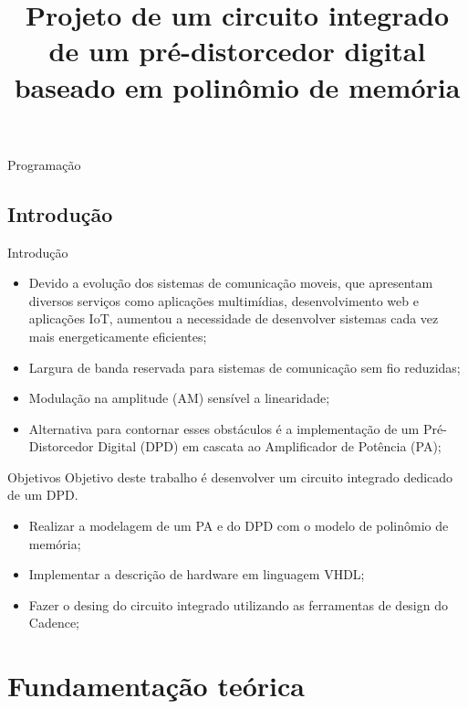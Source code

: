 \documentclass{if-beamer}
\title[Pré-distorcedor digital baseado em polinômio de memória]{\textbf{Projeto de um circuito integrado de um pré-distorcedor digital baseado em polinômio de memória}}
\subtitle{}
\author[Leonardo de Andrade Santos]{\large \negrito{Leonardo de Andrade Santos}}
\institute[UFPR/PR]{
    \small \textit{Universidade Federal do Paraná} \\
}
\date{\the\year}
\begin{document}
\begin{frame}
  \titlepage
\end{frame}

\begin{frame}{Programação}
  \tableofcontents
\end{frame}

\subsection{Introdução}
\begin{frame}{Introdução}
\begin{itemize}
	\item Devido a evolução dos sistemas de comunicação moveis, que apresentam diversos serviços como aplicações multimídias, desenvolvimento web e aplicações IoT, aumentou a necessidade de desenvolver sistemas cada vez mais energeticamente eficientes;
	\item Largura de banda reservada para sistemas de comunicação sem fio reduzidas;
	\item Modulação na amplitude (AM) sensível a linearidade;
	\item Alternativa para contornar esses obstáculos é a implementação de um  Pré-Distorcedor Digital (DPD) em cascata ao Amplificador de Potência (PA);
\end{itemize}
\end{frame}

\begin{frame}{Objetivos}
	Objetivo deste trabalho é desenvolver um circuito integrado dedicado de um DPD.
	\begin{itemize}
		\item Realizar a modelagem de um PA e do DPD com o modelo de polinômio de memória;
		\item Implementar a descrição de hardware em 
		linguagem VHDL;
		\item Fazer o desing do circuito integrado utilizando as ferramentas de design do Cadence;
	\end{itemize}
\end{frame}



\section{Fundamentação teórica}
\end{document}
